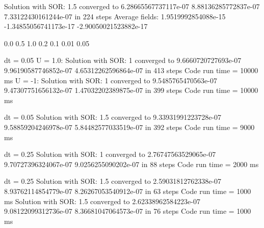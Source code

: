 \documentclass{article}
\begin{document}
\begin{center}


%


Solution with SOR: 1.5 converged to 6.28665567737117e-07  8.88136285772837e-07  7.33122430161244e-07 in 224 steps
Average fields: 1.9519992854088e-15  -1.34855056741173e-17  -2.90050021523882e-17

0.0
0.5
1.0
0.2
0.1
0.01
0.05

dt = 0.05
U = 1.0:  Solution with SOR: 1 converged to 9.6660720727693e-07  9.96190587746852e-07  4.65312262596864e-07 in 413 steps Code run time = 10000 ms
U = -1: Solution with SOR: 1 converged to 9.5485765470563e-07  9.47307751656132e-07  1.47032202389875e-07 in 399 steps Code run time = 10000 ms

dt = 0.05
 Solution with SOR: 1.5 converged to 9.33931991223728e-07  9.58859204246978e-07  5.84482577033519e-07 in 392 steps Code run time = 9000 ms

dt = 0.25
 Solution with SOR: 1 converged to 2.76747563529065e-07  9.70727396324067e-07  9.0256255090202e-07 in 88 steps Code run time = 2000 ms

dt = 0.25
 Solution with SOR: 1.5 converged to 2.59031812762338e-07  8.93762114854779e-07  8.26267053540912e-07 in 63 steps Code run time = 1000 ms
 Solution with SOR: 1.5 converged to 2.62338962584223e-07  9.08122099312736e-07  8.36681047064573e-07 in 76 steps Code run time = 1000 ms



\end{center}
\end{document}
